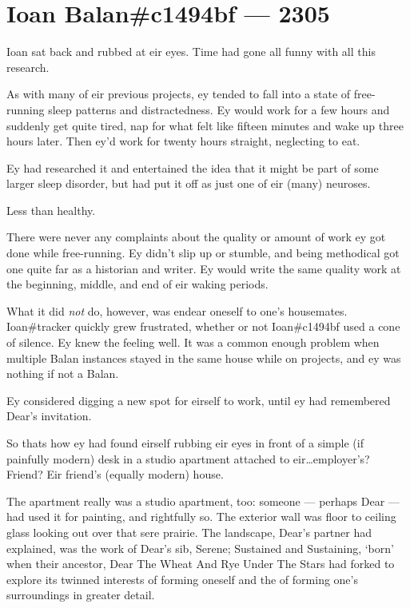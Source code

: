 \chapter*{Ioan Balan\#c1494bf — 2305}

Ioan sat back and rubbed at eir eyes. Time had gone all funny with all this research.

As with many of eir previous projects, ey tended to fall into a state of free-running sleep patterns and distractedness. Ey would work for a few hours and suddenly get quite tired, nap for what felt like fifteen minutes and wake up three hours later. Then ey'd work for twenty hours straight, neglecting to eat.

Ey had researched it and entertained the idea that it might be part of some larger sleep disorder, but had put it off as just one of eir (many) neuroses.

Less than healthy.

There were never any complaints about the quality or amount of work ey got done while free-running. Ey didn't slip up or stumble, and being methodical got one quite far as a historian and writer. Ey would write the same quality work at the beginning, middle, and end of eir waking periods.

What it did \emph{not} do, however, was endear oneself to one's housemates. Ioan\#tracker quickly grew frustrated, whether or not Ioan\#c1494bf used a cone of silence. Ey knew the feeling well. It was a common enough problem when multiple Balan instances stayed in the same house while on projects, and ey was nothing if not a Balan.

Ey considered digging a new spot for eirself to work, until ey had remembered Dear's invitation.

So thats how ey had found eirself rubbing eir eyes in front of a simple (if painfully modern) desk in a studio apartment attached to eir\ldots{}employer's? Friend? Eir friend's (equally modern) house.

The apartment really was a studio apartment, too: someone --- perhaps Dear --- had used it for painting, and rightfully so. The exterior wall was floor to ceiling glass looking out over that sere prairie. The landscape, Dear's partner had explained, was the work of Dear's sib, Serene; Sustained and Sustaining, `born' when their ancestor, Dear The Wheat And Rye Under The Stars had forked to explore its twinned interests of forming oneself and the of forming one's surroundings in greater detail.

